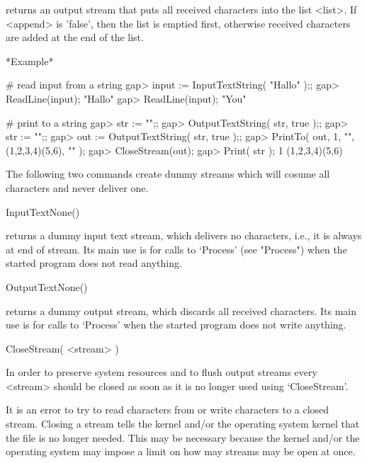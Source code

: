 returns an output stream that puts  all received characters into the list
<list>.   If <append>   is  'false',  then  the list   is  emptied first,
otherwise received characters are added at the end of the list.

*Example*

\begintt
    # read input from a string
    gap> input := InputTextString( "Hallo\nYou\n" );;
    gap> ReadLine(input);
    "Hallo\n"
    gap> ReadLine(input);
    "You\n"

    # print to a string
    gap> str := "";;
    gap> OutputTextString( str, true );;
    gap> str := "";;                    
    gap> out := OutputTextString( str, true );;
    gap> PrintTo( out, 1, "\n", (1,2,3,4)(5,6), "\n" );
    gap> CloseStream(out);
    gap> Print( str );
    1
    (1,2,3,4)(5,6)
\endtt


The following  two commands create  dummy streams  which will  cosume all
characters and never deliver one.


\>InputTextNone()

returns a dummy input text stream, which delivers no characters, i.e., it
is always at end of stream.  Its main use  is for calls to `Process' (see
"Process") when the started program does not read anything.

\>OutputTextNone()

returns a dummy output   stream, which discards all received  characters.
Its main use is for calls to `Process' when  the started program does not
write anything.


\>CloseStream( <stream> )

In order  to preserve system resources  and to flush output streams every
<stream> should  be  closed  as soon   as  it is   no longer   used using
`CloseStream'.

It is an error to  try to read  characters from or  write characters to a
closed  stream.   Closing a  stream tells  the {\GAP}   kernel and/or the
operating system kernel  that the file is  no longer needed.  This may be
necessary  because  the {\GAP} kernel  and/or  the  operating  system may
impose a limit on how may streams may be open at once.


